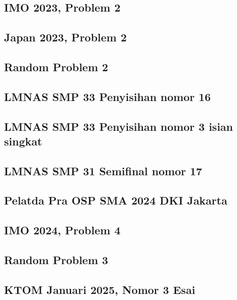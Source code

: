 \subsection{IMO 2023, Problem 2}


\subsection{Japan 2023, Problem 2}


\subsection{Random Problem 2}


\subsection{LMNAS SMP 33 Penyisihan nomor 16}


\subsection{LMNAS SMP 33 Penyisihan nomor 3 isian singkat}


\subsection{LMNAS SMP 31 Semifinal nomor 17}


\subsection{Pelatda Pra OSP SMA 2024 DKI Jakarta}


\subsection{IMO 2024, Problem 4}


\subsection{Random Problem 3}


\subsection{KTOM Januari 2025, Nomor 3 Esai}


